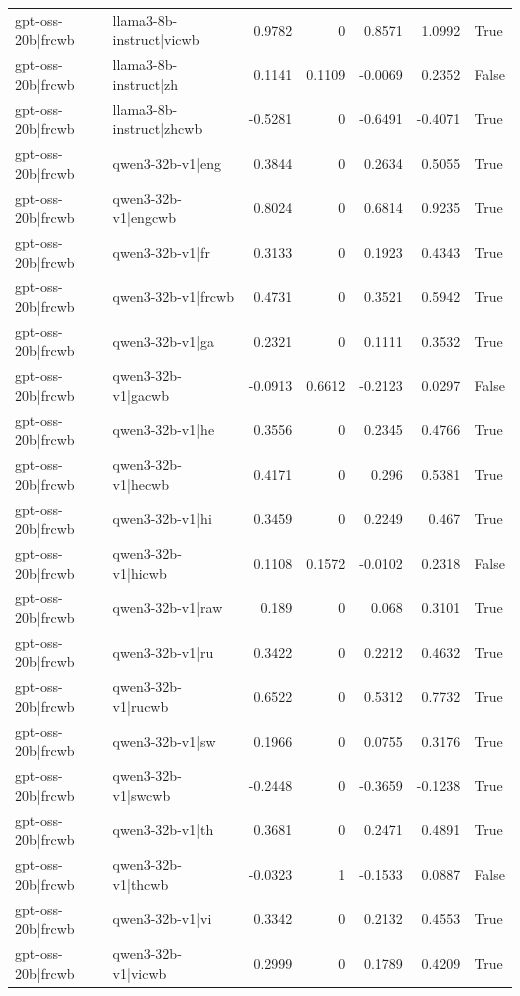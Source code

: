 \begin{table}
\begin{tabular}{l l r r r r l}
gpt-oss-20b|frcwb & llama3-8b-instruct|vicwb & 0.9782 & 0 & 0.8571 & 1.0992 & True \\
gpt-oss-20b|frcwb & llama3-8b-instruct|zh & 0.1141 & 0.1109 & -0.0069 & 0.2352 & False \\
gpt-oss-20b|frcwb & llama3-8b-instruct|zhcwb & -0.5281 & 0 & -0.6491 & -0.4071 & True \\
gpt-oss-20b|frcwb & qwen3-32b-v1|eng & 0.3844 & 0 & 0.2634 & 0.5055 & True \\
gpt-oss-20b|frcwb & qwen3-32b-v1|engcwb & 0.8024 & 0 & 0.6814 & 0.9235 & True \\
gpt-oss-20b|frcwb & qwen3-32b-v1|fr & 0.3133 & 0 & 0.1923 & 0.4343 & True \\
gpt-oss-20b|frcwb & qwen3-32b-v1|frcwb & 0.4731 & 0 & 0.3521 & 0.5942 & True \\
gpt-oss-20b|frcwb & qwen3-32b-v1|ga & 0.2321 & 0 & 0.1111 & 0.3532 & True \\
gpt-oss-20b|frcwb & qwen3-32b-v1|gacwb & -0.0913 & 0.6612 & -0.2123 & 0.0297 & False \\
gpt-oss-20b|frcwb & qwen3-32b-v1|he & 0.3556 & 0 & 0.2345 & 0.4766 & True \\
gpt-oss-20b|frcwb & qwen3-32b-v1|hecwb & 0.4171 & 0 & 0.296 & 0.5381 & True \\
gpt-oss-20b|frcwb & qwen3-32b-v1|hi & 0.3459 & 0 & 0.2249 & 0.467 & True \\
gpt-oss-20b|frcwb & qwen3-32b-v1|hicwb & 0.1108 & 0.1572 & -0.0102 & 0.2318 & False \\
gpt-oss-20b|frcwb & qwen3-32b-v1|raw & 0.189 & 0 & 0.068 & 0.3101 & True \\
gpt-oss-20b|frcwb & qwen3-32b-v1|ru & 0.3422 & 0 & 0.2212 & 0.4632 & True \\
gpt-oss-20b|frcwb & qwen3-32b-v1|rucwb & 0.6522 & 0 & 0.5312 & 0.7732 & True \\
gpt-oss-20b|frcwb & qwen3-32b-v1|sw & 0.1966 & 0 & 0.0755 & 0.3176 & True \\
gpt-oss-20b|frcwb & qwen3-32b-v1|swcwb & -0.2448 & 0 & -0.3659 & -0.1238 & True \\
gpt-oss-20b|frcwb & qwen3-32b-v1|th & 0.3681 & 0 & 0.2471 & 0.4891 & True \\
gpt-oss-20b|frcwb & qwen3-32b-v1|thcwb & -0.0323 & 1 & -0.1533 & 0.0887 & False \\
gpt-oss-20b|frcwb & qwen3-32b-v1|vi & 0.3342 & 0 & 0.2132 & 0.4553 & True \\
gpt-oss-20b|frcwb & qwen3-32b-v1|vicwb & 0.2999 & 0 & 0.1789 & 0.4209 & True \\

\end{tabular}
\end{table}
